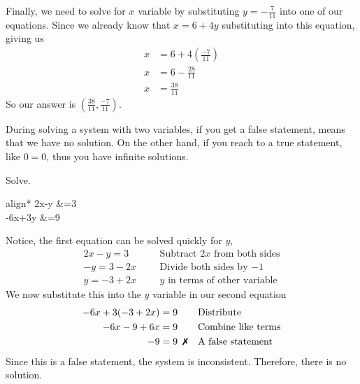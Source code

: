 Finally, we need to solve for $x$ variable by substituting $y=-\frac{7}{11}$ into one of our equations. Since we already know that $x=6+4y$ substituting into this equation, giving us 
		\begin{align*}
			x&=6+4\left(\frac{-7}{11}\right)\\
			x&=6-\frac{28}{11} \\
			x&=\frac{38}{11}
		\end{align*}
So our answer is $\displaystyle \left(\frac{38}{11},\frac{-7}{11}\right)$.
\begin{note}
During solving a system with two variables, if you get a false statement, means that we have no solution. On the other hand, if you reach to a true statement, like $0=0$, thus you have infinite solutions.
\end{note}
\begin{example}
Solve.
		\begin{empheq}[left={\empheqlbrace}]{align*}
				2x-y &=3\\
				-6x+3y &=9	
		\end{empheq}
\end{example}
%
Notice, the first equation can be solved quickly for $y$, 
		\begin{align*}
			2x-y =3&    &   &\text{Subtract $2x$ from both sides} \\
			-y=3-2x&    &   &\text{Divide both sides by $-1$}\\
			\boxed{y=-3+2x}&    &   &\text{$y$ in terms of other variable}
		\end{align*}
We now substitute this into the $y$ variable in our second equation
		\begin{align*}
			-6x+3(-3+2x) =9&		&&\text{Distribute}\\
			-6x-9+6x = 9&           &&\text{Combine like terms}\\
			-9 =9&\ \,\xmark    	&&\text{A false statement}\\
		\end{align*}
Since this is a false statement, the system is inconsistent. Therefore, there is no solution.
